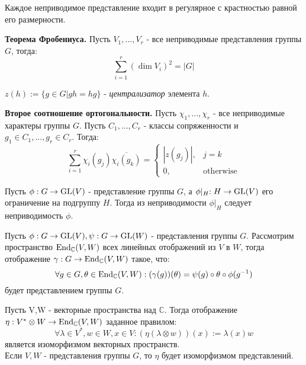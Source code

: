 \begin{ass}
Каждое неприводимое представление входит в регулярное с крастностью равной его размерности.
\end{ass}

\begin{thm}
\textbf{Теорема Фробениуса.} Пусть $V_1,\ldots,V_r$ - все неприводимые представления группы $G$, тогда:
$$\sum_{i=1}^r(\dim V_i)^2 = |G|$$
\end{thm}

\begin{defi}
$z(h):=\{ g\in G | gh=hg\}$ - \textit{централизатор} элемента $h$.
\end{defi}

\begin{thm}
\textbf{Второе соотношение ортогональности.} Пусть $\chi_1,\ldots,\chi_r$ - все неприводимые характеры группы $G$. Пусть $C_1,\ldots,C_r$ - классы сопряженности и $g_1\in C_1,\ldots,g_r\in C_r$. Тогда:
\begin{equation*}
\sum_{i=1}^r\chi_i(g_j)\overline{\chi_i(g_k)} = 
 \begin{cases}
   |z(g_j)|, & j=k\\
   0, &\text{otherwise}
 \end{cases}
\end{equation*}
\end{thm}

\begin{ass}
Пусть ${\phi:G\to\operatorname{GL}(V)}$ - представление группы $G$, а ${\phi\lvert_H:H\to\operatorname{GL}(V)}$ его ограничение на подгруппу $H$. Тогда из неприводимости ${\phi\lvert_H}$ следует неприводимость ${\phi}$.
\end{ass}

\begin{ass}
Пусть $\phi:G\to\operatorname{GL}(V),\psi:G\to\operatorname{GL}(W)$ - представления группы $G$. Рассмотрим пространство $\operatorname{End}_{\mathbb{C}}(V,W)$ всех линейных отображений из $V$ в $W$, тогда отображение $\gamma:G\to\operatorname{End}_{\mathbb{C}}(V,W)$ такое, что:
$$\forall g\in G,\theta\in \operatorname{End}_{\mathbb{C}}(V,W): (\gamma(g))(\theta) = \psi(g)\circ\theta\circ\phi(g^{-1})$$
будет представлением группы $G$.
\end{ass}

\begin{ass}
Пусть V,W - векторные пространства над $\mathbb{C}$. Тогда отображение ${\eta:V^{*}\otimes W\to\operatorname{End}_{\mathbb{C}}(V,W)}$ заданное правилом: $$\forall \lambda\in V^{*},w\in W,x\in V:(\eta(\lambda\otimes w))(x):=\lambda(x)w$$
является изоморфизмом векторных пространств.\\ Если $V,W$ - представления группы $G$, то $\eta$ будет изоморфизмом представлений.
\end{ass}


